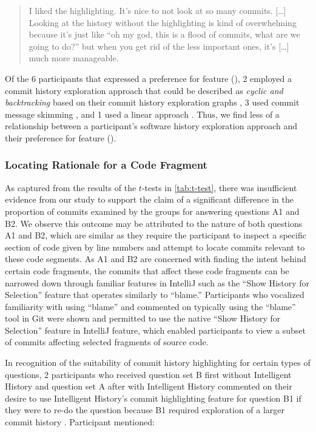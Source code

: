 \begin{quote}
  I liked the highlighting. 
  It’s nice to not look at so many commits. 
  [\dots] Looking at the history without the highlighting is kind of overwhelming because it’s just like ``oh my god, this is a flood of commits, 
  what are we going to do?'' 
  but when you get rid of the less important ones, it’s [\dots] much more manageable.
\end{quote}

Of the 6 participants that expressed a preference for feature (), 
2 employed a commit history exploration approach that could be described as \textit{cyclic and backtracking} based on their commit history exploration graphs ,
3 used commit message skimming , and 1 used a linear approach .
Thus, we find less of a relationship between a participant's software history exploration approach and their preference for feature ().

\subsubsection{Locating Rationale for a Code Fragment}

As captured from the results of the $t$-tests in \autoref{tab:t-test}, 
there was insufficient evidence from our study to support the claim of a significant difference in 
the proportion of commits examined by the groups for answering questions A1 and B2.
We observe this outcome may be attributed to the nature of both questions A1 and B2, 
which are similar as they require the participant to  inspect a specific section of code 
given by line numbers and attempt to locate commits relevant to these code segments.
As A1 and B2 are concerned with finding the intent behind certain code fragments, 
the commits that affect these code fragments can be narrowed down
through familiar features in IntelliJ such as the ``Show History for Selection'' feature 
that operates similarly to  ``blame.''
Participants who vocalized familiarity with using  ``blame'' and commented on typically
using the ``blame'' tool in Git were shown and permitted to use the native 
``Show History for Selection'' feature in IntelliJ feature, 
which enabled participants to view a subset of commits affecting selected fragments of source code.

In recognition of the suitability of commit history highlighting for certain types of questions,
2 participants who received question set B first without Intelligent History and question set A 
after with Intelligent History commented on their desire to use Intelligent History's commit highlighting feature for question B1
if they were to re-do the question because B1 required exploration of a larger commit history .
Participant  mentioned:

